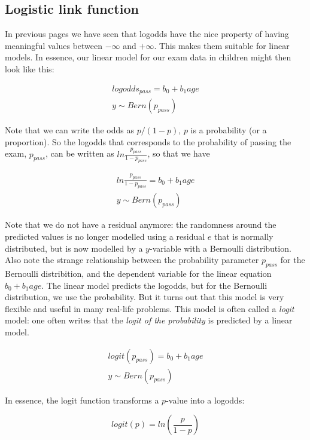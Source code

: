 \documentclass[]{report}\usepackage[]{graphicx}\usepackage[]{color}
\begin{document}
\subsection{Logistic link function}

In previous pages we have seen that logodds have the nice property of having meaningful values between $-\infty$ and $+\infty$. This makes them suitable for linear models. In essence, our linear model for our exam data in children might then look like this:


\begin{eqnarray}
logodds_{pass}= b_0 + b_1 age\\
y \sim Bern(p_{pass})
\end{eqnarray}

Note that we can write the odds as $p/(1-p)$, $p$ is a probability (or a proportion). So the logodds that corresponds to the probability of passing the exam, $p_{pass}$, can be written as $ln\frac{p_{pass}}{1- p_{pass}}$, so that we have


\begin{eqnarray}
ln\frac{p_{pass}}{1- p_{pass}}= b_0 + b_1 age \\
y \sim Bern(p_{pass})
\end{eqnarray}

Note that we do not have a residual anymore: the randomness around the predicted values is no longer modelled using a residual $e$ that is normally distributed, but is now modelled by a $y$-variable with a Bernoulli distribution.
Also note the strange relationship between the probability parameter $p_{pass}$ for the Bernoulli distribition, and the dependent variable for the linear equation $b_0+b_1 age$. The linear model predicts the logodds, but for the Bernoulli distribution, we use the probability. But it turns out that this model is very flexible and useful in many real-life problems. This model is often called a \textit{logit} model: one often writes that the \textit{logit of the probability} is predicted by a linear model.

\begin{eqnarray}
logit(p_{pass}) = b_0 + b_1 age \\
y \sim Bern(p_{pass})
\end{eqnarray}

In essence, the logit function transforms a $p$-value into a logodds:

\begin{equation}
logit(p)= ln( \frac{p}{1-p} ) \nonumber
\end{equation}
\end{document}
